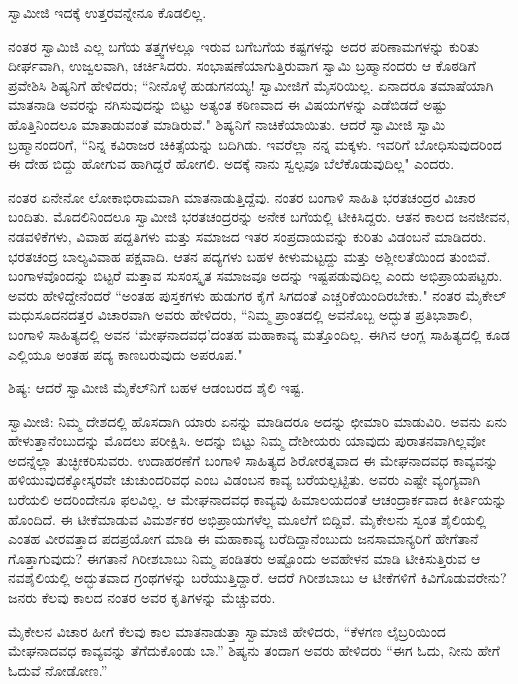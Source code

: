 ಸ್ವಾಮೀಜಿ ಇದಕ್ಕೆ ಉತ್ತರವನ್ನೇನೂ ಕೊಡಲಿಲ್ಲ.

ನಂತರ ಸ್ವಾಮಿಜಿ ಎಲ್ಲ ಬಗೆಯ ತತ್ತ್ವಗಳಲ್ಲೂ ಇರುವ ಬಗೆಬಗೆಯ ಕಷ್ಟಗಳನ್ನು ಅದರ ಪರಿಣಾಮಗಳನ್ನು ಕುರಿತು ದೀರ್ಘವಾಗಿ, ಉಜ್ವಲವಾಗಿ, ಚರ್ಚಿಸಿದರು. ಸಂಭಾಷಣೆಯಾಗುತ್ತಿರುವಾಗ ಸ್ವಾಮಿ ಬ್ರಹ್ಮಾನಂದರು ಆ ಕೊಠಡಿಗೆ ಪ್ರವೇಶಿಸಿ ಶಿಷ್ಯನಿಗೆ ಹೇಳಿದರು; “ನೀನೊಳ್ಳೆ ಹುಡುಗನಯ್ಯ! ಸ್ವಾಮೀಜಿಗೆ ಮೈಸರಿಯಿಲ್ಲ. ಏನಾದರೂ ತಮಾಷೆಯಾಗಿ ಮಾತನಾಡಿ ಅವರನ್ನು ನಗಿಸುವುದನ್ನು ಬಿಟ್ಟು ಅತ್ಯಂತ ಕಠಿಣವಾದ ಈ ವಿಷಯಗಳನ್ನು ಎಡೆಬಿಡದೆ ಅಷ್ಟು ಹೊತ್ತಿನಿಂದಲೂ ಮಾತಾಡುವಂತೆ ಮಾಡಿರುವೆ." ಶಿಷ್ಯನಿಗೆ ನಾಚಿಕೆಯಾಯಿತು. ಆದರೆ ಸ್ವಾಮೀಜಿ ಸ್ವಾಮಿ ಬ್ರಹ್ಮಾನಂದರಿಗೆ, “ನಿನ್ನ ಕವಿರಾಜರ ಚಿಕಿತ್ಸೆಯನ್ನು ಬದಿಗಿಡು. ಇವರೆಲ್ಲಾ ನನ್ನ ಮಕ್ಕಳು. ಇವರಿಗೆ ಬೋಧಿಸುವುದರಿಂದ ಈ ದೇಹ ಬಿದ್ದು ಹೋಗುವ ಹಾಗಿದ್ದರೆ ಹೋಗಲಿ. ಅದಕ್ಕೆ ನಾನು ಸ್ವಲ್ಪವೂ ಬೆಲೆಕೊಡುವುದಿಲ್ಲ" ಎಂದರು.

ನಂತರ ಏನೇನೋ ಲೋಕಾಭಿರಾಮವಾಗಿ ಮಾತನಾಡುತ್ತಿದ್ದೆವು. ನಂತರ ಬಂಗಾಳಿ ಸಾಹಿತಿ ಭರತಚಂದ್ರರ ವಿಚಾರ ಬಂದಿತು. ಮೊದಲಿನಿಂದಲೂ ಸ್ವಾಮೀಜಿ ಭರತಚಂದ್ರರನ್ನು ಅನೇಕ ಬಗೆಯಲ್ಲಿ ಟೀಕಿಸಿದ್ದರು. ಆತನ ಕಾಲದ ಜನಜೀವನ, ನಡವಳಿಕೆಗಳು, ವಿವಾಹ ಪದ್ದತಿಗಳು ಮತ್ತು ಸಮಾಜದ ಇತರ ಸಂಪ್ರದಾಯವನ್ನು ಕುರಿತು ವಿಡಂಬನೆ ಮಾಡಿದರು. ಭರತಚಂದ್ರ ಬಾಲ್ಯವಿವಾಹ ಪಕ್ಷವಾದಿ. ಆತನ ಪದ್ಯಗಳು ಬಹಳ ಕೀಳುಮಟ್ಟದ್ದು ಮತ್ತು ಅಶ್ಲೀಲತೆಯಿಂದ ತುಂಬಿವೆ. ಬಂಗಾಳವೊಂದನ್ನು ಬಿಟ್ಟರೆ ಮತ್ತಾವ ಸುಸಂಸ್ಕೃತ ಸಮಾಜವೂ ಅದನ್ನು ಇಷ್ಟಪಡುವುದಿಲ್ಲ ಎಂದು ಅಭಿಪ್ರಾಯಪಟ್ಟರು. ಅವರು ಹೇಳಿದ್ದೇನೆಂದರೆ “ಅಂತಹ ಪುಸ್ತಕಗಳು ಹುಡುಗರ ಕೈಗೆ ಸಿಗದಂತೆ ಎಚ್ಚರಿಕೆಯಿಂದಿರಬೇಕು." ನಂತರ ಮೈಕೇಲ್ ಮಧುಸೂದನದತ್ತರ ವಿಚಾರವಾಗಿ ಅವರು ಹೇಳಿದರು, “ನಿಮ್ಮ ಪ್ರಾಂತದಲ್ಲಿ ಅವನೊಬ್ಬ ಅದ್ಭುತ ಪ್ರತಿಭಾಶಾಲಿ, ಬಂಗಾಳಿ ಸಾಹಿತ್ಯದಲ್ಲಿ ಅವನ ‘ಮೇಘನಾದವಧ’ದಂತಹ ಮಹಾಕಾವ್ಯ ಮತ್ತೊಂದಿಲ್ಲ. ಈಗಿನ ಆಂಗ್ಲ ಸಾಹಿತ್ಯದಲ್ಲಿ ಕೂಡ ಎಲ್ಲಿಯೂ ಅಂತಹ ಪದ್ಯ ಕಾಣಬರುವುದು ಅಪರೂಪ."

ಶಿಷ್ಯ: ಆದರೆ ಸ್ವಾಮೀಜಿ ಮೈಕೆಲ್‌ನಿಗೆ ಬಹಳ ಆಡಂಬರದ ಶೈಲಿ ಇಷ್ಟ.

ಸ್ವಾಮೀಜಿ: ನಿಮ್ಮ ದೇಶದಲ್ಲಿ ಹೊಸದಾಗಿ ಯಾರು ಏನನ್ನು ಮಾಡಿದರೂ ಅದನ್ನು ಛೀಮಾರಿ ಮಾಡುವಿರಿ. ಅವನು ಏನು ಹೇಳುತ್ತಾನೆಂಬುದನ್ನು ಮೊದಲು ಪರೀಕ್ಷಿಸಿ. ಅದನ್ನು ಬಿಟ್ಟು ನಿಮ್ಮ ದೇಶೀಯರು ಯಾವುದು ಪುರಾತನವಾಗಿಲ್ಲವೋ ಅದನ್ನೆಲ್ಲಾ ತುಚ್ಛೀಕರಿಸುವರು. ಉದಾಹರಣೆಗೆ ಬಂಗಾಳಿ ಸಾಹಿತ್ಯದ ಶಿರೋರತ್ನವಾದ ಈ ಮೇಘನಾದವಧ ಕಾವ್ಯವನ್ನು ಹಳಿಯುವುದಕ್ಕೋಸ್ಕರವೇ ಚುಚುಂದರಿವಧ ಎಂಬ ವಿಡಂಬನ ಕಾವ್ಯ ಬರೆಯಲ್ಪಟ್ಟಿತು. ಅವರು ಎಷ್ಟೇ ವ್ಯಂಗ್ಯವಾಗಿ ಬರೆಯಲಿ ಅದರಿಂದೇನೂ ಫಲವಿಲ್ಲ. ಆ ಮೇಘನಾದವಧ ಕಾವ್ಯವು ಹಿಮಾಲಯದಂತೆ ಆಚಂದ್ರಾರ್ಕವಾದ ಕೀರ್ತಿಯನ್ನು ಹೊಂದಿದೆ. ಈ ಟೀಕೆಮಾಡುವ ವಿಮರ್ಶಕರ ಅಭಿಪ್ರಾಯಗಳೆಲ್ಲ ಮೂಲೆಗೆ ಬಿದ್ದಿವೆ. ಮೈಕೇಲನು ಸ್ವಂತ ಶೈಲಿಯಲ್ಲಿ ಎಂತಹ ವೀರವತ್ತಾದ ಪದಪ್ರಯೋಗ ಮಾಡಿ ಈ ಮಹಾಕಾವ್ಯ ಬರೆದಿದ್ದಾನೆಂಬುದು ಜನಸಾಮಾನ್ಯರಿಗೆ ಹೇಗೆತಾನೆ ಗೊತ್ತಾಗುವುದು? ಈಗತಾನೆ ಗಿರೀಶಬಾಬು ನಿಮ್ಮ ಪಂಡಿತರು ಅಷ್ಟೊಂದು ಅವಹೇಳನ ಮಾಡಿ ಟೀಕಿಸುತ್ತಿರುವ ಆ ನವಶೈಲಿಯಲ್ಲಿ ಅದ್ಭುತವಾದ ಗ್ರಂಥಗಳನ್ನು ಬರೆಯುತ್ತಿದ್ದಾರೆ. ಆದರೆ ಗಿರೀಶಬಾಬು ಆ ಟೀಕೆಗಳಿಗೆ ಕಿವಿಗೊಡುವರೇನು? ಜನರು ಕೆಲವು ಕಾಲದ ನಂತರ ಅವರ ಕೃತಿಗಳನ್ನು ಮೆಚ್ಚುವರು.

ಮೈಕೇಲನ ವಿಚಾರ ಹೀಗೆ ಕೆಲವು ಕಾಲ ಮಾತನಾಡುತ್ತಾ ಸ್ವಾಮಾಜಿ ಹೇಳಿದರು, “ಕೆಳಗಣ ಲೈಬ್ರರಿಯಿಂದ ಮೇಘನಾದವಧ ಕಾವ್ಯವನ್ನು ತೆಗೆದುಕೊಂಡು ಬಾ.” ಶಿಷ್ಯನು ತಂದಾಗ ಅವರು ಹೇಳಿದರು “ಈಗ ಓದು, ನೀನು ಹೇಗೆ ಓದುವೆ ನೋಡೋಣ.”

